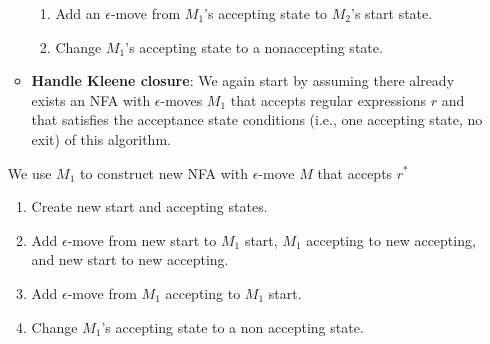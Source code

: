 \documentclass{report}
\begin{document}
\begin{itemize}
\begin{itemize}
\begin{figure}[ht]
            \centering
            \label{fig:crit6}
        \end{figure}
        \bigbreak \noindent 
        \begin{enumerate}
            \item Add an $\epsilon$-move from $M_{1}$’s accepting state to $M_{2}$’s start state.
            \item Change $M_{1}$’s accepting state to a nonaccepting state.
        \end{enumerate}
        \pagebreak 
    \item \textbf{Handle Kleene closure}: We again start by assuming there already exists an NFA with $\epsilon$-moves $M_{1}$ that accepts regular expressions $r$ and that satisfies the acceptance state conditions (i.e., one accepting state, no exit) of this algorithm.
        \bigbreak \noindent 
        \begin{figure}[ht]
            \centering
            \label{fig:crit7}
        \end{figure}
\end{itemize}
\bigbreak \noindent 
We use $M_{1}$ to construct new NFA with $\epsilon$-move $M$ that accepts $r^{*}$
\begin{figure}[ht]
    \centering
    \label{fig:crit9}
\end{figure}
\bigbreak \noindent 
\begin{enumerate}
    \item Create new start and accepting states.
    \item Add $\epsilon$-move from new start to $M_{1}$ start, $M_{1}$ accepting to new accepting, and new start to new accepting.
    \item Add $\epsilon$-move from $M_{1}$ accepting to $M_{1}$ start. 
    \item Change $M_{1}$'s accepting state to a non accepting state.
\end{enumerate}


\end{itemize}
\end{document}
